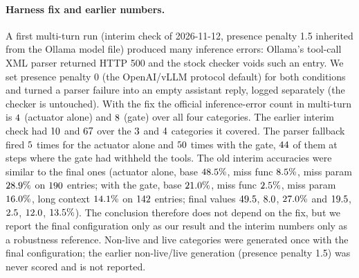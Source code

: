 \documentclass[10pt,twocolumn,letterpaper]{article}
\begin{document}
\paragraph{Harness fix and earlier numbers.} A first multi-turn run (interim check of 2026-11-12, presence penalty 1.5 inherited from the Ollama model file) produced many inference errors: Ollama's tool-call XML parser returned HTTP 500 and the stock checker voids such an entry. We set presence penalty 0 (the OpenAI/vLLM protocol default) for both conditions and turned a parser failure into an empty assistant reply, logged separately (the checker is untouched). With the fix the official inference-error count in multi-turn is $4$ (actuator alone) and $8$ (gate) over all four categories. The earlier interim check had $10$ and $67$ over the $3$ and $4$ categories it covered. The parser fallback fired $5$ times for the actuator alone and $50$ times with the gate, $44$ of them at steps where the gate had withheld the tools. The old interim accuracies were similar to the final ones (actuator alone, base $48.5\%$, miss func $8.5\%$, miss param $28.9\%$ on $190$ entries; with the gate, base $21.0\%$, miss func $2.5\%$, miss param $16.0\%$, long context $14.1\%$ on $142$ entries; final values $49.5$, $8.0$, $27.0\%$ and $19.5$, $2.5$, $12.0$, $13.5\%$). The conclusion therefore does not depend on the fix, but we report the final configuration only as our result and the interim numbers only as a robustness reference. Non-live and live categories were generated once with the final configuration; the earlier non-live/live generation (presence penalty 1.5) was never scored and is not reported.

\begin{table}[t]
\centering
\scriptsize
\setlength{\tabcolsep}{4pt}
\caption{Official BFCL v4 on a local Qwen3.5-9B actuator with and without the GNCA respond gate, one run per condition, presence penalty 0. $p$: two-sided exact McNemar test on the entries where exactly one condition is correct (unadjusted). $^a$ Multi-turn: official \texttt{inference\_error}; other categories: requests that timed out (recorded in the result file). $^b$ Official \texttt{empty\_turn\_model\_response} (multi-turn only). $^c$ Decision steps in which the gate withheld the tools (entries with at least one such step). Memory rows count the three backends separately. All values are generated from the official score files. Source S9 (Table~\ref{tab:sources}).}
\label{tab:bfcl-official}

\end{table}
\end{document}
